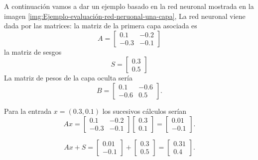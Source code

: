 A continuación vamos a dar un ejemplo basado en la red neuronal mostrada en la imagen \ref{img:Ejemplo-evaluación-red-neruonal-una-capa}, 
La red neuronal viene dada por las matrices: 
la matriz de la primera capa asociada es 
\begin{equation}
     A = 
        \begin{bmatrix}
            0.1 & -0.2 \\
            -0.3 & -0.1 
        \end{bmatrix}  
\end{equation}
la matriz de sesgos 
\begin{equation}
    S = 
        \begin{bmatrix}
            0.3  \\
            0.5 
        \end{bmatrix}  
\end{equation}
La matriz de pesos de la capa oculta sería 
\begin{equation}
     B = 
    \begin{bmatrix}
        0.1 & -0.6 \\
        -0.6 & 0.5
    \end{bmatrix}. 
\end{equation}

Para la entrada  $x = (0.3, 0.1)$ los sucesivos cálculos serían
\begin{equation}
    A x = 
    \begin{bmatrix}
        0.1 & -0.2 \\
        -0.3 & -0.1 
    \end{bmatrix}  
    \begin{bmatrix}
        0.3  \\
        0.1 
    \end{bmatrix}
    = 
    \begin{bmatrix}
        0.01  \\
        -0.1 
    \end{bmatrix}
    . 
\end{equation}

\begin{equation}
    A x +S= 
    \begin{bmatrix}
        0.01  \\
        -0.1 
    \end{bmatrix}
    + 
    \begin{bmatrix}
        0.3  \\
        0.5 
    \end{bmatrix}
    = 
    \begin{bmatrix}
        0.31  \\
        0.4 
    \end{bmatrix}
    . 
\end{equation}

